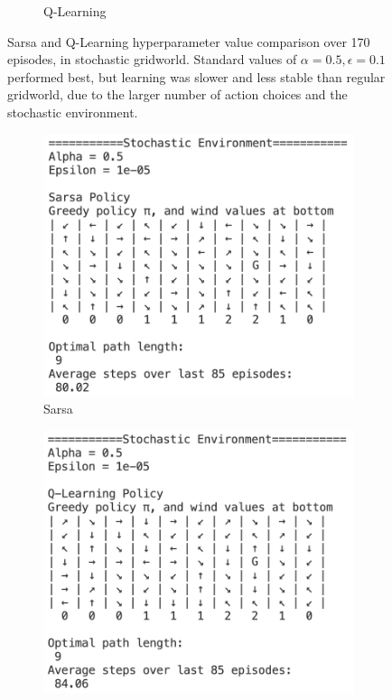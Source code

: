 \documentclass{article}
\begin{document}
\begin{figure}[h!]
\begin{subfigure}{0.45\textwidth}
    \caption{Q-Learning}
  \end{subfigure}
  \caption{Sarsa and Q-Learning hyperparameter value comparison over 170 episodes, in stochastic gridworld. Standard values of $\alpha = 0.5, \epsilon = 0.1$ performed best, but learning was slower and less stable than regular gridworld, due to the larger number of action choices and the stochastic environment.}
  \label{fig:stochastic_hyperparam}
\end{figure}

\begin{figure}[h!]
  \centering
  \begin{subfigure}{0.45\textwidth} 
    \includegraphics[width=\textwidth]{sarsa_stochastic_example.png}
    \caption{Sarsa}
  \end{subfigure}
  \hspace{0.05\textwidth}  
  \begin{subfigure}{0.45\textwidth}  
    \includegraphics[width=\textwidth]{q_stochastic_example.png}

\end{subfigure}
\end{figure}
\end{document}
